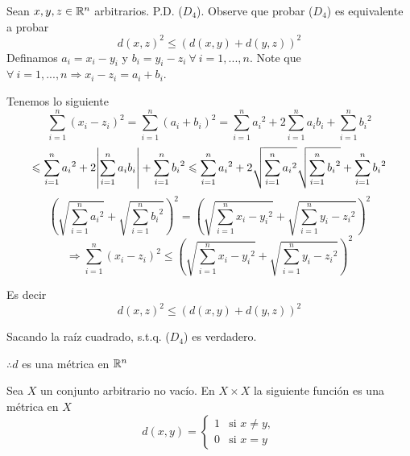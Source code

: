         \begin{proofexplanation}
            Sean $x,y,z \in \mathbb{R}^n$ arbitrarios. P.D. ($D_4$). Observe que probar ($D_4$) es equivalente a probar 
            \begin{equation*}
                d(x,z)^2 \leqslant (d(x,y) + d(y,z))^2
            \end{equation*}
            Definamos $a_i = x_i-y_i$ y $b_i = y_i-z_i \: \forall \: i = 1,...,n$. Note que $\forall \: i = 1,...,n \Rightarrow x_i-z_i = a_i+b_i$.

            Tenemos lo siguiente
            \begin{equation*}
                 \sum_{i=1}^{n} (x_i-z_i)^2 =  \sum_{i=1}^{n} (a_i+b_i)^2 = \sum_{i=1}^{n} {a_i}^{2} + 2 \sum_{i=1}^{n} {a_i}{b_i} + \sum_{i=1}^{n} {b_i}^{2}
            \end{equation*}
            \begin{equation*}
                \leqslant \sum_{i=1}^{n} {a_i}^{2} + 2 \abs{\sum_{i=1}^{n} {a_i}{b_i}} + \sum_{i=1}^{n} {b_i}^{2} \leqslant \sum_{i=1}^{n} {a_i}^{2} + 2 \sqrt{\sum_{i=1}^{n} {a_i}^{2}}\sqrt{\sum_{i=1}^{n} {b_i}^{2}} + \sum_{i=1}^{n} {b_i}^{2}
            \end{equation*}
            \begin{equation*}
                {\left( \sqrt{\sum_{i=1}^{n} {a_i}^{2}} + \sqrt{\sum_{i=1}^{n} {b_i}^{2}}\right)}^{2} =  {\left( \sqrt{\sum_{i=1}^{n} {x_i-y_i}^{2}} + \sqrt{\sum_{i=1}^{n} {y_i-z_i}^{2}}\right)}^{2}
            \end{equation*}
            \begin{equation*}
                \Rightarrow \sum_{i=1}^{n} (x_i-z_i)^2 \leqslant {\left( \sqrt{\sum_{i=1}^{n} {x_i-y_i}^{2}} + \sqrt{\sum_{i=1}^{n} {y_i-z_i}^{2}}\right)}^{2} 
            \end{equation*}

            Es decir
            \begin{equation*}
                d(x,z)^2 \leqslant (d(x,y) + d(y,z))^2
            \end{equation*}

            Sacando la raíz cuadrado, s.t.q. ($D_4$) es verdadero.

            $\therefore d$ es una métrica en $\mathbb{R}^n$
        \end{proofexplanation}

\begin{eg}
    Sea $X$ un conjunto arbitrario no vacío. En $X \times X$ la siguiente función es una métrica en $X$
    \begin{equation*}
        d(x,y) = 
     \begin{cases}
              1 & \text{si } x \neq y,\\
              0 & \text{si } x = y
     \end{cases}
    \end{equation*}
\end{eg}

